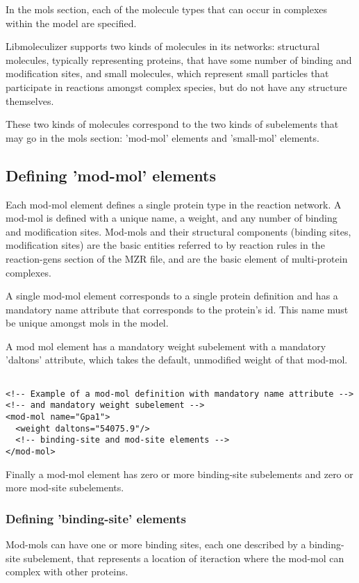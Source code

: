 In the mols section, each of the molecule types that can occur in
complexes within the model are specified.

Libmoleculizer supports two kinds of molecules in its networks:
structural molecules, typically representing proteins, that have some
number of binding and modification sites, and small molecules, which
represent small particles that participate in reactions amongst
complex species, but do not have any structure themselves.

These two kinds of molecules correspond to the two kinds of
subelements that may go in the mols section: 'mod-mol' elements and
'small-mol' elements.   

\subsection{Defining 'mod-mol' elements}
Each mod-mol element defines a single protein type in the reaction 
network.  A mod-mol is defined with a unique name, a weight, and any number
of binding and modification sites. Mod-mols and their structural
components (binding sites, modification sites) are the basic entities 
referred to by reaction rules in the reaction-gens section of the MZR
file, and are the basic element of multi-protein complexes.

A single mod-mol element corresponds to a single protein definition
and has a mandatory name attribute that corresponds to the protein's
id.  This name must be unique amongst mols in the model.  

A mod mol element has a mandatory weight subelement with a mandatory
'daltons' attribute, which takes the default, unmodified weight of
that mod-mol.

\lstset{language=XML}
\begin{lstlisting}[caption=Basic mod-mol structure, label=basicmodmolstructure ]

<!-- Example of a mod-mol definition with mandatory name attribute -->
<!-- and mandatory weight subelement -->
<mod-mol name="Gpa1">
  <weight daltons="54075.9"/>
  <!-- binding-site and mod-site elements -->
</mod-mol>

\end{lstlisting}

Finally a mod-mol element has zero or more binding-site subelements
and zero or more mod-site subelements.  

\subsubsection{Defining 'binding-site' elements}
Mod-mols can have one or more binding sites, each one described by a
binding-site subelement, that represents a location of iteraction
where the mod-mol can complex with other proteins.  

